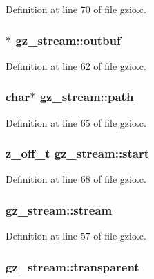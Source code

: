 Definition at line 70 of file gzio.\-c.

\hypertarget{structgz__stream_acef09df121278a0b4053f45356bfa823}{
\subsubsection[{outbuf}]{$\ast$ gz\-\_\-stream\-::outbuf}}\label{structgz__stream_acef09df121278a0b4053f45356bfa823}


Definition at line 62 of file gzio.\-c.

\hypertarget{structgz__stream_a75008e50b323bcb85198023003cdc2c6}{
\subsubsection[{path}]{\setlength{\rightskip}{0pt plus 5cm}char$\ast$ gz\-\_\-stream\-::path}}\label{structgz__stream_a75008e50b323bcb85198023003cdc2c6}


Definition at line 65 of file gzio.\-c.

\hypertarget{structgz__stream_ae136c7871c6a87f0190c8245921e8145}{
\subsubsection[{start}]{\setlength{\rightskip}{0pt plus 5cm}z\-\_\-off\-\_\-t gz\-\_\-stream\-::start}}\label{structgz__stream_ae136c7871c6a87f0190c8245921e8145}


Definition at line 68 of file gzio.\-c.

\hypertarget{structgz__stream_a08366a18e41afcc67dd0965074286618}{
\subsubsection[{stream}]{ gz\-\_\-stream\-::stream}}\label{structgz__stream_a08366a18e41afcc67dd0965074286618}


Definition at line 57 of file gzio.\-c.

\hypertarget{structgz__stream_a5bbfa8460d94ffea4ac6d78aedfc70d1}{
\subsubsection[{transparent}]{ gz\-\_\-stream\-::transparent}}\label{structgz__stream_a5bbfa8460d94ffea4ac6d78aedfc70d1}


